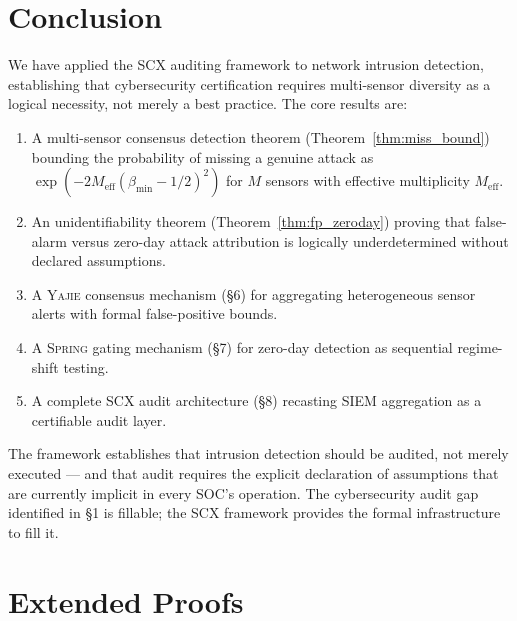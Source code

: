 \documentclass[11pt,a4paper]{article}
\theoremstyle{definition}
\theoremstyle{remark}
\newcommand{\SCX}{\textsc{SCX}}
\newcommand{\Yajie}{\textsc{Yajie}}
\newcommand{\Spring}{\textsc{Spring}}
\begin{document}
\section{Conclusion }
\label{sec:conclusion}

We have applied the \SCX{} auditing framework to network intrusion detection, establishing that cybersecurity certification requires multi-sensor diversity as a logical necessity, not merely a best practice. The core results are:

\begin{enumerate}[label=(\roman*)]
    \item A multi-sensor consensus detection theorem (Theorem~\ref{thm:miss_bound}) bounding the probability of missing a genuine attack as $\exp(-2 M_{\mathrm{eff}} (\beta_{\min} - 1/2)^2)$ for $M$ sensors with effective multiplicity $M_{\mathrm{eff}}$.
    \item An unidentifiability theorem (Theorem~\ref{thm:fp_zeroday}) proving that false-alarm versus zero-day attack attribution is logically underdetermined without declared assumptions.
    \item A \Yajie{} consensus mechanism (\S6) for aggregating heterogeneous sensor alerts with formal false-positive bounds.
    \item A \Spring{} gating mechanism (\S7) for zero-day detection as sequential regime-shift testing.
    \item A complete SCX audit architecture (\S8) recasting SIEM aggregation as a certifiable audit layer.
\end{enumerate}

The framework establishes that intrusion detection should be audited, not merely executed — and that audit requires the explicit declaration of assumptions that are currently implicit in every SOC's operation. The cybersecurity audit gap identified in \S1 is fillable; the SCX framework provides the formal infrastructure to fill it.

\appendix

\section{Extended Proofs }
\end{document}
